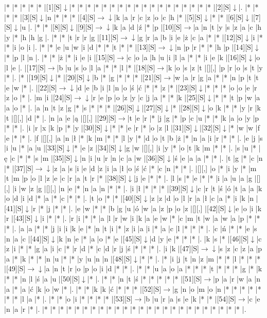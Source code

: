 \documentclass[11pt]{article}
\newcommand\drarr{$\rightarrow \!\!\!\!\! \downarrow$}
\newcommand\rarr{$\rightarrow$}
\newcommand\darr{$\downarrow$}
\begin{document}
\noindent\begin{Puzzle}{24}{32}|*	|*	|*	|*	|*	|[1][S]\darr	|*	|*	|*	|*	|*	|*	|*	|*	|*	|*	|*	|*	|*	|*	|*	|*	|*	|*	|[2][S]\darr	|.
|*	|*	|*	|*	|[3][S]\darr	|n	|*	|*	|*	|[4][S]\drarr	|k	|a	|r	|c	|z	|o	|c	|h	|*	|[5][S]\darr	|*	|*	|[6][S]\darr	|[7][S]\darr	|u	|.
|*	|*	|[8][S]\darr	|[9][S]\drarr	|k	|a	|d	|ź	|*	|p	|[10][S]\rarr	|a	|n	|t	|y	|s	|z	|a	|c	|h	|y	|*	|h	|h	|g	|.
|*	|*	|t	|r	|r	|g	|[11][S]\drarr	|g	|r	|a	|b	|i	|e	|ż	|c	|a	|*	|*	|[12][S]\darr	|i	|*	|*	|i	|o	|i	|.
|*	|*	|e	|u	|w	|i	|d	|*	|*	|t	|*	|*	|[13][S]\drarr	|n	|p	|r	|*	|*	|h	|p	|[14][S]\darr	|*	|p	|l	|n	|.
|*	|*	|ż	|*	|i	|e	|i	|[15][S]\rarr	|c	|o	|a	|h	|u	|i	|l	|a	|*	|*	|i	|e	|k	|[16][S]\darr	|o	|l	|e	|.
|[17][S]\rarr	|b	|u	|s	|o	|l	|a	|*	|*	|l	|*	|[18][S]\rarr	|k	|o	|s	|z	|t	|[][,]{ }	|p	|r	|o	|s	|t	|y	|*	|.
|*	|[19][S]\darr	|*	|[20][S]\darr	|b	|*	|g	|*	|*	|*	|[21][S]\rarr	|w	|a	|r	|g	|a	|*	|*	|n	|p	|t	|t	|e	|w	|*	|.
|[22][S]\drarr	|d	|e	|b	|i	|l	|n	|o	|ś	|ć	|*	|*	|z	|*	|[23][S]\darr	|*	|*	|*	|o	|o	|e	|r	|z	|o	|*	|.
|m	|i	|[24][S]\drarr	|r	|e	|p	|o	|z	|y	|c	|j	|a	|*	|*	|k	|[25][S]\darr	|*	|*	|t	|p	|w	|a	|a	|o	|*	|.
|a	|n	|t	|z	|g	|*	|s	|*	|*	|*	|[26][S]\darr	|[27][S]\darr	|*	|[28][S]\darr	|o	|k	|*	|*	|y	|r	|k	|t	|[][,]{ }	|d	|*	|.
|n	|a	|e	|ą	|[][,]{ }	|[29][S]\rarr	|t	|e	|r	|*	|j	|g	|*	|p	|c	|u	|*	|*	|k	|a	|o	|y	|p	|*	|*	|.
|i	|r	|x	|k	|p	|*	|y	|[30][S]\darr	|*	|*	|e	|r	|*	|o	|z	|l	|[31][S]\darr	|[32][S]\darr	|*	|w	|w	|f	|e	|*	|*	|.
|f	|[][,]{ }	|a	|n	|ł	|*	|k	|m	|*	|*	|l	|y	|*	|d	|o	|t	|b	|ż	|*	|n	|a	|i	|r	|*	|*	|.
|e	|j	|s	|i	|u	|*	|a	|u	|[33][S]\darr	|*	|e	|z	|[34][S]\darr	|g	|w	|[][,]{ }	|i	|y	|*	|o	|t	|k	|m	|*	|*	|.
|s	|u	|*	|ę	|c	|*	|*	|s	|m	|[35][S]\darr	|n	|i	|u	|r	|n	|c	|a	|w	|[36][S]\darr	|ś	|e	|a	|a	|*	|*	|.
|t	|g	|*	|c	|n	|*	|[37][S]\drarr	|z	|a	|s	|i	|e	|d	|z	|i	|a	|ł	|o	|ś	|ć	|*	|c	|n	|*	|*	|.
|[][,]{ }	|o	|*	|i	|y	|*	|m	|t	|m	|p	|o	|l	|z	|e	|c	|r	|a	|t	|r	|*	|[38][S]\darr	|j	|e	|*	|*	|.
|l	|s	|*	|e	|*	|*	|i	|a	|u	|a	|g	|[][,]{ }	|i	|w	|z	|g	|[][,]{ }	|n	|e	|*	|n	|a	|n	|*	|*	|.
|i	|ł	|*	|*	|*	|[39][S]\darr	|c	|r	|t	|ś	|ó	|t	|a	|a	|k	|o	|d	|i	|d	|*	|a	|*	|c	|*	|*	|.
|t	|o	|*	|*	|[40][S]\darr	|z	|z	|d	|o	|l	|r	|a	|ł	|c	|a	|*	|i	|k	|n	|[41][S]\darr	|r	|*	|j	|*	|*	|.
|e	|w	|*	|*	|b	|g	|u	|ó	|w	|a	|z	|p	|o	|z	|[][,]{ }	|[42][S]\darr	|e	|o	|i	|k	|r	|[43][S]\darr	|i	|*	|*	|.
|r	|i	|*	|*	|a	|l	|r	|w	|i	|k	|a	|e	|w	|*	|c	|m	|t	|w	|a	|w	|a	|p	|*	|*	|*	|.
|a	|a	|*	|*	|j	|i	|i	|k	|e	|*	|n	|t	|i	|*	|z	|i	|a	|i	|*	|a	|c	|l	|*	|*	|*	|.
|c	|ń	|*	|*	|e	|s	|n	|a	|c	|[44][S]\darr	|k	|n	|e	|*	|a	|o	|*	|e	|[45][S]\darr	|d	|y	|e	|*	|*	|*	|.
|k	|s	|*	|[46][S]\darr	|c	|z	|i	|*	|*	|g	|a	|i	|c	|*	|r	|d	|*	|c	|d	|r	|j	|ś	|*	|*	|*	|.
|i	|k	|[47][S]\drarr	|s	|z	|c	|z	|a	|p	|a	|*	|k	|*	|*	|n	|u	|*	|*	|y	|u	|n	|n	|[48][S]\darr	|*	|*	|.
|*	|i	|j	|t	|n	|z	|m	|*	|*	|l	|*	|*	|*	|[49][S]\drarr	|a	|n	|t	|r	|o	|p	|o	|i	|d	|*	|*	|.
|*	|*	|u	|a	|o	|a	|*	|*	|*	|t	|*	|*	|*	|g	|*	|k	|*	|*	|n	|l	|ś	|a	|u	|[50][S]\darr	|*	|.
|*	|*	|n	|t	|ś	|*	|*	|*	|*	|*	|[51][S]\rarr	|p	|a	|r	|w	|a	|n	|a	|*	|a	|ć	|k	|o	|w	|*	|.
|*	|*	|k	|k	|ć	|*	|*	|*	|[52][S]\rarr	|g	|n	|o	|m	|o	|n	|*	|*	|*	|*	|*	|*	|*	|l	|a	|*	|.
|*	|*	|o	|i	|*	|*	|*	|*	|[53][S]\rarr	|b	|u	|r	|a	|s	|e	|k	|*	|*	|[54][S]\rarr	|c	|e	|n	|a	|r	|*	|.
|*	|*	|*	|*	|*	|*	|*	|*	|*	|*	|*	|*	|*	|*	|*	|*	|*	|*	|*	|*	|*	|*	|*	|*	|*	|.\end{Puzzle}
\end{document}
